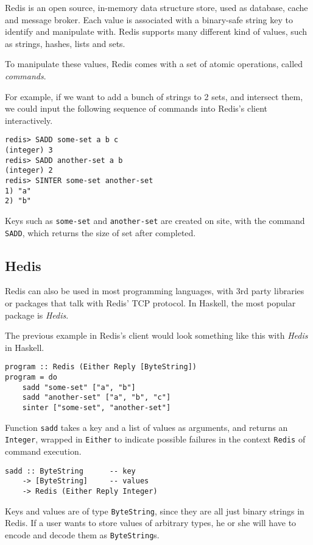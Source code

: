 \documentclass[pldi]{sigplanconf-pldi16}
\begin{document}
Redis is an open source, in-memory data structure store, used as
database, cache and message broker. Each value is associated with a binary-safe
string key to identify and manipulate with. Redis supports many different
kind of values, such as strings, hashes, lists and sets.

To manipulate these values, Redis comes with a set of atomic operations,
called \emph{commands}.

For example, if we want to add a bunch of strings to 2 sets, and intersect them,
we could input the following sequence of commands into Redis's client
interactively.

\begin{verbatim}
redis> SADD some-set a b c
(integer) 3
redis> SADD another-set a b
(integer) 2
redis> SINTER some-set another-set
1) "a"
2) "b"
\end{verbatim}

Keys such as \texttt{some-set} and \texttt{another-set}
are created on site, with the command \texttt{SADD}, which returns
the size of set after completed.

\subsection{Hedis}
Redis can also be used in most programming languages, with 3rd party libraries
or packages that talk with Redis' TCP protocol. In Haskell, the most popular
package is \emph{Hedis}.

The previous example in Redis's client would look something like this with
\emph{Hedis} in Haskell.
\begin{verbatim}
program :: Redis (Either Reply [ByteString])
program = do
    sadd "some-set" ["a", "b"]
    sadd "another-set" ["a", "b", "c"]
    sinter ["some-set", "another-set"]
\end{verbatim}

Function \texttt{sadd} takes a key and a list of values as
arguments, and returns an \texttt{Integer}, wrapped in
\texttt{Either} to indicate possible failures in the context
\texttt{Redis} of command execution.

\begin{verbatim}
sadd :: ByteString      -- key
    -> [ByteString]     -- values
    -> Redis (Either Reply Integer)
\end{verbatim}

Keys and values are of type \texttt{ByteString}, since they are all
just binary strings in Redis. If a user wants to store values of
arbitrary types, he or she will have to encode and decode them as
 \texttt{ByteString}s.
\end{document}
